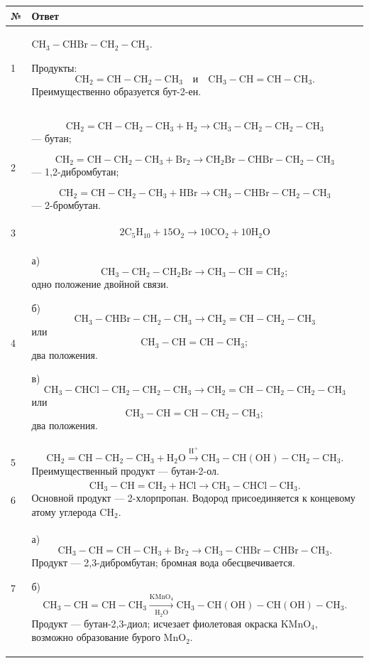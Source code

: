 \documentclass[a4paper,12pt]{article}
\begin{document}
\begin{longtable}{@{}p{0.8cm}p{13.8cm}@{}}
\toprule
\textbf{№} & \textbf{Ответ} \\
\midrule
\endhead

1 &
\(\mathrm{CH_3-CHBr-CH_2-CH_3}\).

Продукты:
\[
\mathrm{CH_2=CH-CH_2-CH_3}
\quad\text{и}\quad
\mathrm{CH_3-CH=CH-CH_3}.
\]
Преимущественно образуется бут-2-ен.
\\

\midrule

2 &
\[
\mathrm{CH_2=CH-CH_2-CH_3+H_2
\rightarrow CH_3-CH_2-CH_2-CH_3}
\]
--- бутан;

\[
\mathrm{CH_2=CH-CH_2-CH_3+Br_2
\rightarrow CH_2Br-CHBr-CH_2-CH_3}
\]
--- 1,2-дибромбутан;

\[
\mathrm{CH_2=CH-CH_2-CH_3+HBr
\rightarrow CH_3-CHBr-CH_2-CH_3}
\]
--- 2-бромбутан.
\\

\midrule

3 &
\[
\boxed{
\mathrm{2C_5H_{10}+15O_2
\rightarrow10CO_2+10H_2O}
}
\]
\\

\midrule

4 &
а)
\[
\mathrm{CH_3-CH_2-CH_2Br}
\rightarrow
\mathrm{CH_3-CH=CH_2};
\]
одно положение двойной связи.

б)
\[
\mathrm{CH_3-CHBr-CH_2-CH_3}
\rightarrow
\mathrm{CH_2=CH-CH_2-CH_3}
\]
или
\[
\mathrm{CH_3-CH=CH-CH_3};
\]
два положения.

в)
\[
\mathrm{CH_3-CHCl-CH_2-CH_2-CH_3}
\rightarrow
\mathrm{CH_2=CH-CH_2-CH_2-CH_3}
\]
или
\[
\mathrm{CH_3-CH=CH-CH_2-CH_3};
\]
два положения.
\\

\midrule

5 &
\[
\mathrm{CH_2=CH-CH_2-CH_3+H_2O}
\xrightarrow{\mathrm{H^+}}
\mathrm{CH_3-CH(OH)-CH_2-CH_3}.
\]
Преимущественный продукт --- бутан-2-ол.
\\

\midrule

6 &
\[
\mathrm{CH_3-CH=CH_2+HCl
\rightarrow
CH_3-CHCl-CH_3}.
\]
Основной продукт --- 2-хлорпропан. Водород присоединяется к концевому атому углерода \(\mathrm{CH_2}\).
\\

\midrule

7 &
а)
\[
\mathrm{CH_3-CH=CH-CH_3+Br_2
\rightarrow
CH_3-CHBr-CHBr-CH_3}.
\]
Продукт --- 2,3-дибромбутан; бромная вода обесцвечивается.

б)
\[
\mathrm{CH_3-CH=CH-CH_3}
\xrightarrow[\mathrm{H_2O}]{\mathrm{KMnO_4}}
\mathrm{CH_3-CH(OH)-CH(OH)-CH_3}.
\]
Продукт --- бутан-2,3-диол; исчезает фиолетовая окраска \(\mathrm{KMnO_4}\), возможно образование бурого \(\mathrm{MnO_2}\).
\\


\end{longtable}
\end{document}
